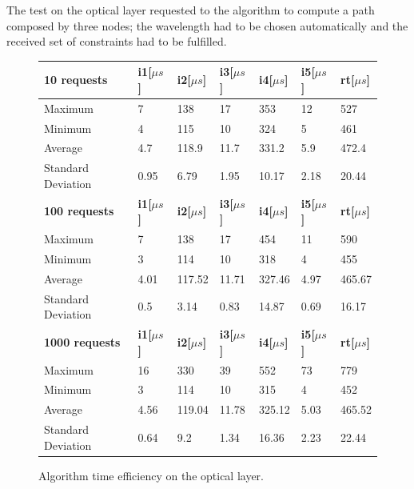 \documentclass[10pt,a4paper]{report}
\begin{document}
The test on the optical layer requested to the algorithm to compute a
path composed by three nodes; the wavelength had to be chosen
automatically and the received set of constraints had to be fulfilled.
\begin{figure}[!htbp]
  \begin{center}
    \begin{tabular}{|l||l|l|l|l|l||l|}
      \hline
      \textbf{10 requests} & \textbf{i1[\(\mu s\)]} & \textbf{i2[\(\mu s\)]} & \textbf{i3[\(\mu s\)]} & \textbf{i4[\(\mu s\)]} &
      \textbf{i5[\(\mu s\)]} & \textbf{rt[\(\mu s\)]} \\\hline
      Maximum & 7 & 138 & 17 & 353 & 12 & 527 \\
      Minimum & 4 & 115 & 10 & 324 & 5 & 461 \\
      Average & 4.7 & 118.9 & 11.7 & 331.2 & 5.9 & 472.4 \\
      Standard Deviation & 0.95 & 6.79 & 1.95 & 10.17 & 2.18 & 20.44
      \\ \hline
      \textbf{100 requests} & \textbf{i1[\(\mu s\)]} & \textbf{i2[\(\mu s\)]} & \textbf{i3[\(\mu s\)]} & \textbf{i4[\(\mu s\)]} &
      \textbf{i5[\(\mu s\)]} & \textbf{rt[\(\mu s\)]} \\\hline
      Maximum & 7 & 138 & 17 & 454 & 11 & 590 \\
      Minimum & 3 & 114 & 10 & 318 & 4 & 455 \\
      Average & 4.01 & 117.52 & 11.71 & 327.46 & 4.97 & 465.67 \\
      Standard Deviation & 0.5 & 3.14 & 0.83 & 14.87 & 0.69 & 16.17
      \\ \hline
      \textbf{1000 requests} & \textbf{i1[\(\mu s\)]} & \textbf{i2[\(\mu s\)]} & \textbf{i3[\(\mu s\)]} & \textbf{i4[\(\mu s\)]} &
      \textbf{i5[\(\mu s\)]} & \textbf{rt[\(\mu s\)]} \\\hline
      Maximum & 16 & 330 & 39 & 552 & 73 & 779 \\
      Minimum & 3 & 114 & 10 & 315 & 4 & 452 \\
      Average & 4.56 & 119.04 & 11.78 & 325.12 & 5.03 & 465.52 \\
      Standard Deviation & 0.64 & 9.2 & 1.34 & 16.36 & 2.23 & 22.44 \\
      \hline
    \end{tabular}
    \caption[Time efficiency on optical layer]{Algorithm time
      efficiency on the optical layer.}
    \label{fig:test_opt}
  \end{center}
\end{figure}
\end{document}
